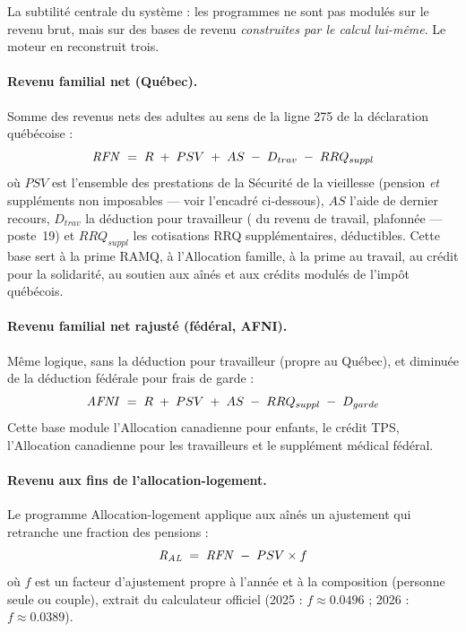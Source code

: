 La subtilité centrale du système : les programmes ne sont pas modulés sur le
revenu brut, mais sur des bases de revenu \emph{construites par le calcul
lui-même}. Le moteur en reconstruit trois.

\paragraph{Revenu familial net (Québec).} Somme des revenus nets des adultes
au sens de la ligne 275 de la déclaration québécoise :
\begin{equation}
\label{eq:rfn}
\mathit{RFN} \;=\; R \;+\; PSV \;+\; AS \;-\; D_{trav} \;-\; RRQ_{suppl}
\end{equation}
où $PSV$ est l'ensemble des prestations de la Sécurité de la vieillesse
(pension \emph{et} suppléments non imposables --- voir l'encadré ci-dessous),
$AS$ l'aide de dernier recours, $D_{trav}$ la déduction pour travailleur
( du revenu de travail, plafonnée --- poste~19) et $RRQ_{suppl}$ les
cotisations RRQ supplémentaires, déductibles. Cette base sert à la prime
RAMQ, à l'Allocation famille, à la prime au travail, au crédit pour la
solidarité, au soutien aux aînés et aux crédits modulés de l'impôt québécois.

\paragraph{Revenu familial net rajusté (fédéral, AFNI).} Même logique, sans
la déduction pour travailleur (propre au Québec), et diminuée de la déduction
fédérale pour frais de garde :
\begin{equation}
\label{eq:afni}
\mathit{AFNI} \;=\; R \;+\; PSV \;+\; AS \;-\; RRQ_{suppl} \;-\; D_{garde}
\end{equation}
Cette base module l'Allocation canadienne pour enfants, le crédit TPS,
l'Allocation canadienne pour les travailleurs et le supplément médical
fédéral.

\paragraph{Revenu aux fins de l'allocation-logement.} Le programme
Allocation-logement applique aux aînés un ajustement qui retranche une
fraction des pensions :
\begin{equation}
\label{eq:ral}
\mathit{R_{AL}} \;=\; \mathit{RFN} \;-\; PSV \times f
\end{equation}
où $f$ est un facteur d'ajustement propre à l'année et à la composition
(personne seule ou couple), extrait du calculateur officiel
(2025 : $f \approx \num{0.0496}$ ; 2026 : $f \approx \num{0.0389}$).

